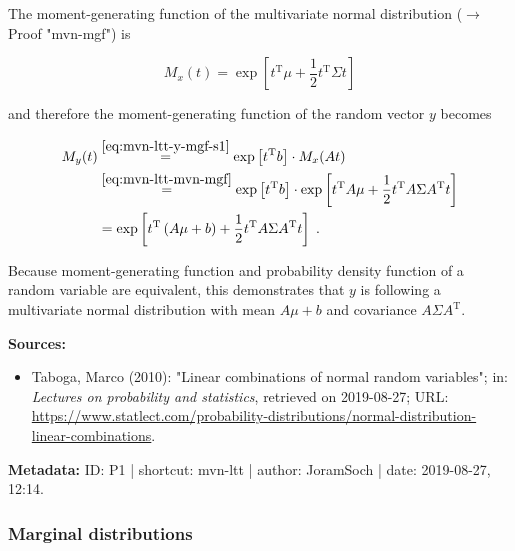 \documentclass[a4paper,12pt,twoside]{book}
\begin{document}
The moment-generating function of the multivariate normal distribution ($\rightarrow$ Proof "mvn-mgf") is

\begin{equation} \label{eq:mvn-ltt-mvn-mgf}
M_x(t) = \exp \left[ t^\mathrm{T} \mu + \frac{1}{2} t^\mathrm{T} \Sigma t \right]
\end{equation}

and therefore the moment-generating function of the random vector $y$ becomes

\begin{equation} \label{eq:mvn-ltt-y-mgf-s2}
\begin{split}
M_y(t) &\overset{\eqref{eq:mvn-ltt-y-mgf-s1}}{=} \exp \left[ t^\mathrm{T} b \right] \cdot M_x(At) \\
&\overset{\eqref{eq:mvn-ltt-mvn-mgf}}{=} \exp \left[ t^\mathrm{T} b \right] \cdot \exp \left[ t^\mathrm{T} A \mu + \frac{1}{2} t^\mathrm{T} A \Sigma A^\mathrm{T} t \right] \\
&= \exp \left[ t^\mathrm{T} \left( A \mu + b \right) + \frac{1}{2} t^\mathrm{T} A \Sigma A^\mathrm{T} t \right] \; .
\end{split}
\end{equation}

Because moment-generating function and probability density function of a random variable are equivalent, this demonstrates that $y$ is following a multivariate normal distribution with mean $A \mu + b$ and covariance $A \Sigma A^\mathrm{T}$.


\vspace{1em}
\textbf{Sources:}
\begin{itemize}
\item Taboga, Marco (2010): "Linear combinations of normal random variables"; in: \textit{Lectures on probability and statistics}, retrieved on 2019-08-27; URL: \url{https://www.statlect.com/probability-distributions/normal-distribution-linear-combinations}.
\end{itemize}


\vspace{1em}
\textbf{Metadata:} ID: P1 | shortcut: mvn-ltt | author: JoramSoch | date: 2019-08-27, 12:14.
\vspace{1em}



\subsubsection[\textbf{Marginal distributions}]{Marginal distributions} \label{sec:mvn-marg}
\setcounter{equation}{0}
\end{document}
